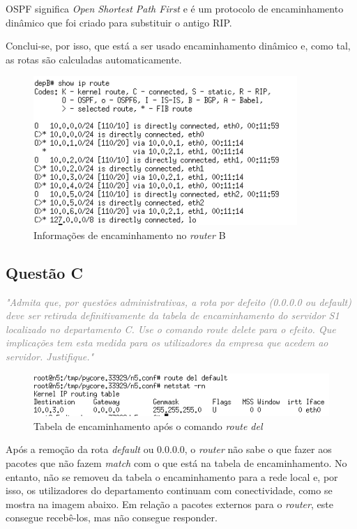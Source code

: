 \documentclass{llncs}
\newcommand{\questionE}[1]{\textcolor{gray}{\textit{"#1"}}}
\begin{document}
OSPF significa \textit{Open Shortest Path First} e é um protocolo de encaminhamento dinâmico que foi criado para substituir o antigo RIP.

Conclui-se, por isso, que está a ser usado encaminhamento dinâmico e, como tal, as rotas são calculadas automaticamente.

\begin{figure}[H]
\begin{center}
\includegraphics[width=10cm]{PARTEB_2b_OSPFrunningNoRouterB.PNG}
\end{center}
\caption{Informações de encaminhamento no \textit{router} B}
\end{figure}

\subsection{Questão C}
\hspace{3mm}
\questionE{Admita que, por questões administrativas, a rota por	defeito	(0.0.0.0 ou \textit{default}) deve	ser retirada definitivamente da tabela de encaminhamento do servidor S1 localizado no departamento C. Use o comando \textit{route delete} para o efeito. Que implicações tem esta medida para os utilizadores da empresa que acedem ao servidor. Justifique.}\\

\begin{figure}[H]
\begin{center}
\includegraphics[width=12cm]{PARTEB_2c_rotaapagada.PNG}
\end{center}
\caption{Tabela de encaminhamento após o comando \textit{route del}}
\end{figure}

Após a remoção da rota \textit{default} ou 0.0.0.0, o \textit{router} não sabe o que fazer aos pacotes que não fazem \textit{match} com o que está na tabela de encaminhamento. 
No entanto, não se removeu da tabela o encaminhamento para a rede local e, por isso, os utilizadores do departamento continuam com conectividade, como se mostra na imagem abaixo.
Em relação a pacotes externos para o \textit{router}, este consegue recebê-los, mas não consegue responder.
\end{document}
